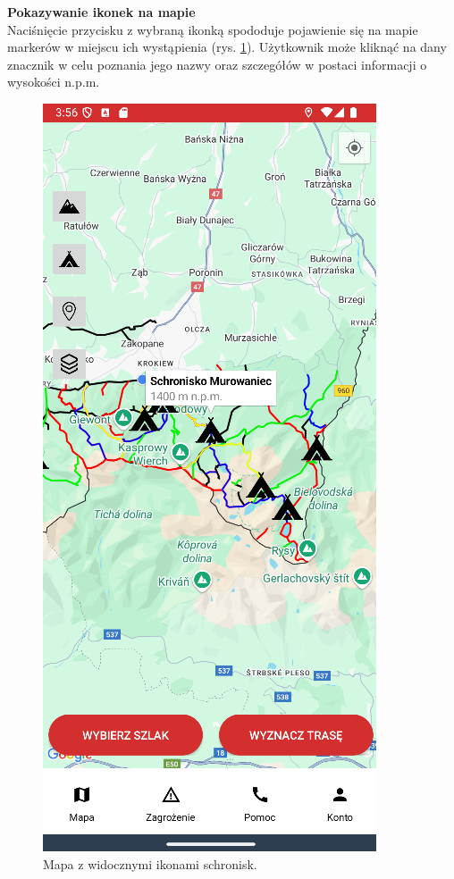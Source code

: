 \noindent
\textbf{Pokazywanie ikonek na mapie} \\
\indent Naciśnięcie przycisku z wybraną ikonką spododuje pojawienie się na mapie markerów w miejscu ich wystąpienia (rys. \ref{widok:ikony}). Użytkownik może kliknąć na dany znacznik w celu poznania jego nazwy oraz szczegółów w postaci informacji o wysokości n.p.m.
\noindent
\begin{figure}[H]
    \centering
    \includegraphics[scale=0.6]{img/imp/widok-ikony.png}
    \caption{Mapa z widocznymi ikonami schronisk.}
    \label{widok:ikony}
\end{figure}


